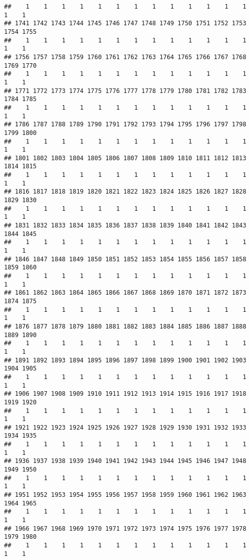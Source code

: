\documentclass[]{article}
\begin{document}
\begin{verbatim}
##    1    1    1    1    1    1    1    1    1    1    1    1    1    1    1 
## 1741 1742 1743 1744 1745 1746 1747 1748 1749 1750 1751 1752 1753 1754 1755 
##    1    1    1    1    1    1    1    1    1    1    1    1    1    1    1 
## 1756 1757 1758 1759 1760 1761 1762 1763 1764 1765 1766 1767 1768 1769 1770 
##    1    1    1    1    1    1    1    1    1    1    1    1    1    1    1 
## 1771 1772 1773 1774 1775 1776 1777 1778 1779 1780 1781 1782 1783 1784 1785 
##    1    1    1    1    1    1    1    1    1    1    1    1    1    1    1 
## 1786 1787 1788 1789 1790 1791 1792 1793 1794 1795 1796 1797 1798 1799 1800 
##    1    1    1    1    1    1    1    1    1    1    1    1    1    1    1 
## 1801 1802 1803 1804 1805 1806 1807 1808 1809 1810 1811 1812 1813 1814 1815 
##    1    1    1    1    1    1    1    1    1    1    1    1    1    1    1 
## 1816 1817 1818 1819 1820 1821 1822 1823 1824 1825 1826 1827 1828 1829 1830 
##    1    1    1    1    1    1    1    1    1    1    1    1    1    1    1 
## 1831 1832 1833 1834 1835 1836 1837 1838 1839 1840 1841 1842 1843 1844 1845 
##    1    1    1    1    1    1    1    1    1    1    1    1    1    1    1 
## 1846 1847 1848 1849 1850 1851 1852 1853 1854 1855 1856 1857 1858 1859 1860 
##    1    1    1    1    1    1    1    1    1    1    1    1    1    1    1 
## 1861 1862 1863 1864 1865 1866 1867 1868 1869 1870 1871 1872 1873 1874 1875 
##    1    1    1    1    1    1    1    1    1    1    1    1    1    1    1 
## 1876 1877 1878 1879 1880 1881 1882 1883 1884 1885 1886 1887 1888 1889 1890 
##    1    1    1    1    1    1    1    1    1    1    1    1    1    1    1 
## 1891 1892 1893 1894 1895 1896 1897 1898 1899 1900 1901 1902 1903 1904 1905 
##    1    1    1    1    1    1    1    1    1    1    1    1    1    1    1 
## 1906 1907 1908 1909 1910 1911 1912 1913 1914 1915 1916 1917 1918 1919 1920 
##    1    1    1    1    1    1    1    1    1    1    1    1    1    1    1 
## 1921 1922 1923 1924 1925 1926 1927 1928 1929 1930 1931 1932 1933 1934 1935 
##    1    1    1    1    1    1    1    1    1    1    1    1    1    1    1 
## 1936 1937 1938 1939 1940 1941 1942 1943 1944 1945 1946 1947 1948 1949 1950 
##    1    1    1    1    1    1    1    1    1    1    1    1    1    1    1 
## 1951 1952 1953 1954 1955 1956 1957 1958 1959 1960 1961 1962 1963 1964 1965 
##    1    1    1    1    1    1    1    1    1    1    1    1    1    1    1 
## 1966 1967 1968 1969 1970 1971 1972 1973 1974 1975 1976 1977 1978 1979 1980 
##    1    1    1    1    1    1    1    1    1    1    1    1    1    1    1 

\end{verbatim}
\end{document}
